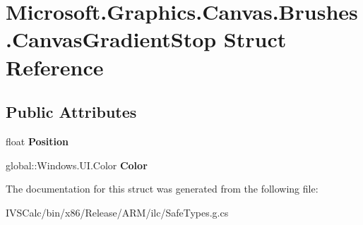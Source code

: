 \hypertarget{struct_microsoft_1_1_graphics_1_1_canvas_1_1_brushes_1_1_canvas_gradient_stop}{}\section{Microsoft.\+Graphics.\+Canvas.\+Brushes.\+Canvas\+Gradient\+Stop Struct Reference}
\label{struct_microsoft_1_1_graphics_1_1_canvas_1_1_brushes_1_1_canvas_gradient_stop}
\subsection*{Public Attributes}
\begin{DoxyCompactItemize}
\item 
\mbox{\label{struct_microsoft_1_1_graphics_1_1_canvas_1_1_brushes_1_1_canvas_gradient_stop_a8df4809aa433c1edc486e1f5a49be86f}} 
float {\bfseries Position}
\item 
\mbox{\label{struct_microsoft_1_1_graphics_1_1_canvas_1_1_brushes_1_1_canvas_gradient_stop_aecf93f25e82ad206d83c51b2811b406c}} 
global\+::\+Windows.\+U\+I.\+Color {\bfseries Color}
\end{DoxyCompactItemize}


The documentation for this struct was generated from the following file\+:\begin{DoxyCompactItemize}
\item 
I\+V\+S\+Calc/bin/x86/\+Release/\+A\+R\+M/ilc/Safe\+Types.\+g.\+cs\end{DoxyCompactItemize}
